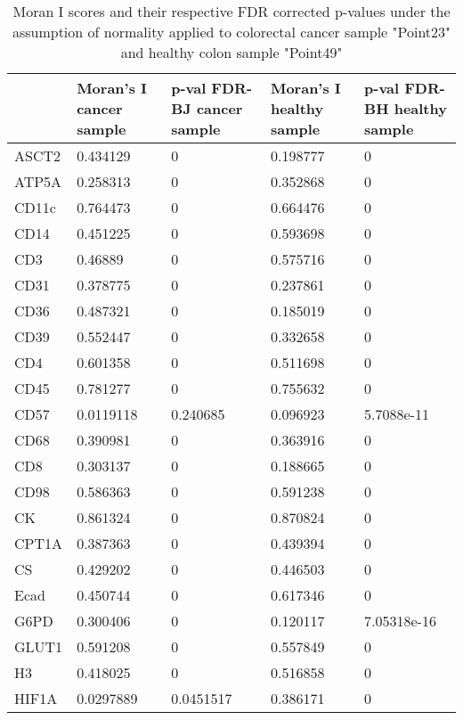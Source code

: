 \begin{table}[!h]
    \centering
    \caption{Moran I scores and their respective FDR corrected p-values under the assumption of normality applied to colorectal cancer sample "Point23" and healthy colon sample "Point49"}
    \begin{tabular}{ l p{3cm} p{3cm} p{3cm} p{3cm}}
    \hline
        \textbf{} & \textbf{Moran's I \newline cancer sample} & \textbf{p-val FDR-BJ cancer sample} & \textbf{Moran's I \newline healthy sample} & \textbf{p-val FDR-BH healthy sample} \\ \hline
        ASCT2 & 0.434129 & 0 & 0.198777 & 0 \\
        ATP5A & 0.258313 & 0 & 0.352868 & 0 \\
        CD11c & 0.764473 & 0 & 0.664476 & 0 \\
        CD14 & 0.451225 & 0 & 0.593698 & 0 \\
        CD3 & 0.46889 & 0 & 0.575716 & 0 \\
        CD31 & 0.378775 & 0 & 0.237861 & 0 \\
        CD36 & 0.487321 & 0 & 0.185019 & 0 \\
        CD39 & 0.552447 & 0 & 0.332658 & 0 \\
        CD4 & 0.601358 & 0 & 0.511698 & 0 \\
        CD45 & 0.781277 & 0 & 0.755632 & 0 \\
        CD57 & 0.0119118 & 0.240685 & 0.096923 & 5.7088e-11 \\
        CD68 & 0.390981 & 0 & 0.363916 & 0 \\
        CD8 & 0.303137 & 0 & 0.188665 & 0 \\
        CD98 & 0.586363 & 0 & 0.591238 & 0 \\
        CK & 0.861324 & 0 & 0.870824 & 0 \\
        CPT1A & 0.387363 & 0 & 0.439394 & 0 \\
        CS & 0.429202 & 0 & 0.446503 & 0 \\
        Ecad & 0.450744 & 0 & 0.617346 & 0 \\
        G6PD & 0.300406 & 0 & 0.120117 & 7.05318e-16 \\
        GLUT1 & 0.591208 & 0 & 0.557849 & 0 \\
        H3 & 0.418025 & 0 & 0.516858 & 0 \\
        HIF1A & 0.0297889 & 0.0451517 & 0.386171 & 0 \\

\end{tabular}
\end{table}
